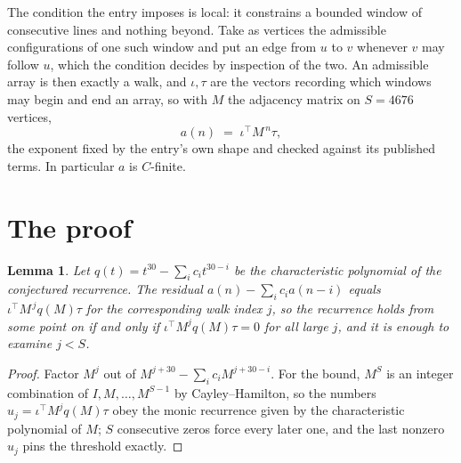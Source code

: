 \documentclass[11pt,a4paper]{article}
\theoremstyle{plain}
\newtheorem{lemma}[theorem]{Lemma}
\theoremstyle{definition}
\begin{document}
The condition the entry imposes is local: it constrains a bounded window of consecutive lines and nothing beyond. Take as vertices the admissible configurations of one such window and put an edge from $u$ to $v$ whenever $v$ may follow $u$, which the condition decides by inspection of the two.
An admissible array is then exactly a walk, and $\iota,\tau$ are the vectors recording which windows may begin and end an array, so with $M$ the adjacency matrix on $S=4676$ vertices,
\[
a(n)\;=\;\iota^{\!\top}M^{\,n}\tau ,
\]
the exponent fixed by the entry's own shape and checked against its published terms. In
particular $a$ is $C$-finite.

\section{The proof}

\begin{lemma}\label{lem:crit}
Let $q(t)=t^{30}-\sum_i c_it^{30-i}$ be the characteristic polynomial of the
conjectured recurrence. The residual $a(n)-\sum_ic_ia(n-i)$ equals
$\iota^{\!\top}M^{\,j}q(M)\tau$ for the corresponding walk index $j$, so the recurrence
holds from some point on if and only if $\iota^{\!\top}M^{j}q(M)\tau=0$ for all large $j$,
and it is enough to examine $j<S$.
\end{lemma}

\begin{proof}
Factor $M^{j}$ out of $M^{j+30}-\sum_ic_iM^{j+30-i}$. For the bound, $M^{S}$
is an integer combination of $I,M,\dots,M^{S-1}$ by Cayley--Hamilton, so the numbers
$u_j=\iota^{\!\top}M^{j}q(M)\tau$ obey the monic recurrence given by the characteristic
polynomial of $M$; $S$ consecutive zeros force every later one, and the last nonzero $u_j$
pins the threshold exactly.
\end{proof}
\end{document}
